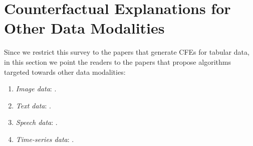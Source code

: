 \section{Counterfactual Explanations for Other Data Modalities}
\label{sec:otherdatamodality}

Since we restrict this survey to the papers that generate CFEs for tabular data, 
in this section we point the readers to the papers that propose algorithms targeted towards other data modalities: 
\begin{enumerate}
    \item \emph{Image data}: \citep{Hendricks-image-CFE, beyond_trivial_cfe_images, liu_generative_2019, cdeepex_images, attribute_based_images, cfe_knockoff_images, da-dgcex_images, fast_cfe_images, latent-cf_images, conditional_gan_cfe_looveren, contrastive-cfe-images-CLEAR, cfe-text+images-DiscGrad, cfe_images_onfly_scope_disc, Elliott2021_adversarial_cfe_images, cfe-images-STEEX, oh-cfe-images-BIN, Akula-CFE-CoCoX-images, conceptual-cfe-abid, Filandrianos-CFE-Images, Smith-CFE-images-robot-action, akula-cfe-CX-ToM-images-interactivity, khorram-cycle-cfe-images, li-cfe-chest-xray-images, holtgen-DeDUCE-images, sanchez-diffusion-causal-cfe-images, jeanneret-diffusion-cfe-images, ghandeharioun-DISSECT-images, Dash-evaluate-bias-images, vermeire-explainable-images, Hvilshoj-ECINN-images, Mertes-GANterfactual-Medical-Images, yang-attribute-perturbation-text+images, Alipour-visual-question-answering-cfe, oh-cfe-alzheimer-images, vandenhende-cfe-visual-images, cfe-visual-explanation-goyal2019, Kenny-cfe-images-semifactual, SCOUT_cfe_images, encoder_cfe_image, Gohar-images-cfe-bayesian-model}. 
    
    \item \emph{Text data}: \citep{Gradual_Construction, tolkachev-CFE-text, cfe-text+images-DiscGrad, ramon-cfe-comparison-text+behavior, CFE-COIN-VQA, ravfogel-2021-cfe-text, Madaan-cfe-text, yang-cfe-financial-text, robeer-cfe-realistic-text, yang-attribute-perturbation-text+images, chen-2021-kace-cfe-text}.
    
    \item \emph{Speech data}: \citep{Zhang-emotion-vocal-recognition-cfe}. 
    
    \item \emph{Time-series data}: \citep{cfe_multivariate_time_series, conditional_gan_cfe_looveren, cf-timeseries1, wang-cfe-time-series-ICU-cardio, sulem-cfe-time-series-anomaly-detection, Dice-time-series-ext, wang_cfe-time-series-latentcf++, karlsson-cfe-time-series, cfe-sequential-data-Tsirtsis}. 
    

\end{enumerate}
